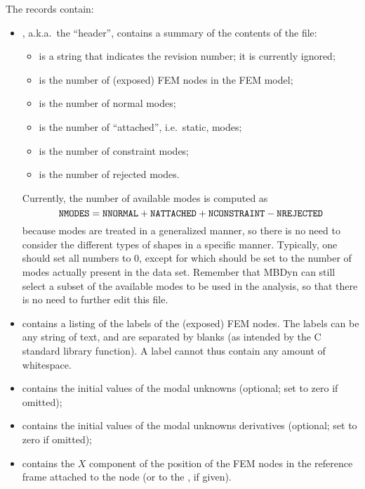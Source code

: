 The records contain:
\begin{itemize}
\item {}, a.k.a.\ the ``header'', contains a summary
of the contents of the file:
	\begin{itemize}
	\item {} is a string that indicates the revision number;
	it is currently ignored;
	\item {} is the number of (exposed) FEM nodes 
	in the FEM model;
	\item {} is the number of normal modes;
	\item {} is the number of ``attached'',
	i.e.\ static, modes;
	\item {} is the number of constraint modes;
	\item {} is the number of rejected modes.
	\end{itemize}
Currently, the number of available modes is computed as
\begin{displaymath}
	\texttt{NMODES} = \texttt{NNORMAL} + \texttt{NATTACHED}
		+ \texttt{NCONSTRAINT} - \texttt{NREJECTED}
\end{displaymath}
because modes are treated in a generalized manner,
so there is no need to consider the different types of shapes
in a specific manner.
Typically, one should set all numbers to 0, except for
 which should be set to the number of modes
actually present in the data set.
Remember that MBDyn can still select a subset of the available 
modes to be used in the analysis, so that there is no need 
to further edit this file.

\item {} contains a listing of the  labels
of the (exposed) FEM nodes.
The labels can be any string of text, and are separated by blanks
(as intended by the  C standard library function).
A label cannot thus contain any amount of whitespace.

\item {} contains the initial values of the 
modal unknowns  (optional; set to zero if omitted);

\item {} contains the initial values of the 
modal unknowns derivatives (optional; set to zero if omitted);

\item {} contains the $X$ component of the position
of the  FEM nodes in the reference frame attached 
to the  node (or to the , if given).


\end{itemize}
